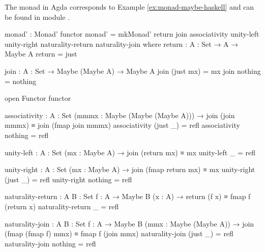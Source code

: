 \begin{example}
  \label{ex:monad-maybe-agda}

  The  monad in Agda corresponds to Example
  \ref{ex:monad-maybe-haskell} and can be found in module
  .
  \begin{codeagda}
monad' : Monad' functor
monad' = mkMonad' return join associativity unity-left unity-right
                  naturality-return naturality-join
  where
    return : {A : Set} → A → Maybe A
    return = just

    join : {A : Set} → Maybe (Maybe A) → Maybe A
    join (just mx) = mx
    join nothing   = nothing

    open Functor functor

    associativity : {A : Set} (mmmx : Maybe (Maybe (Maybe A))) →
                    join (join mmmx) ≡ join (fmap join mmmx)
    associativity (just _) = refl
    associativity nothing  = refl

    unity-left : {A : Set} (mx : Maybe A) → join (return mx) ≡ mx
    unity-left _ = refl

    unity-right : {A : Set} (mx : Maybe A) → join (fmap return mx) ≡ mx
    unity-right (just _) = refl
    unity-right nothing  = refl

    naturality-return : {A B : Set} {f : A → Maybe B} (x : A) →
                        return (f x) ≡ fmap f (return x)
    naturality-return _ = refl

    naturality-join : {A B : Set} {f : A → Maybe B} (mmx : Maybe (Maybe A)) →
                      join (fmap (fmap f) mmx) ≡ fmap f (join mmx)
    naturality-join (just _) = refl
    naturality-join nothing  = refl
  \end{codeagda}

\end{example}

